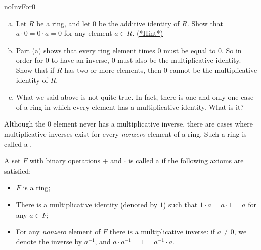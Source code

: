 \begin{exercise}{noInvFor0}
\begin{enumerate}[(a)]
\item
Let $R$ be a ring, and let $0$ be the additive identity of $R$.  Show that $a \cdot 0 = 0 \cdot a = 0$ for any element $a \in R$. 
\hyperref[sec:polyrings:hints]{(*Hint*)} 
\item
Part (a) shows that every ring element times 0 must be equal to 0.  So in order for 0 to have an inverse, 0 must also be the multiplicative identity. Show that 
if $R$ has two or more elements, then 0 cannot be the multiplicative identity of $R$.
\item
What we said above is not quite true. In fact, there is one and only one case of a ring in which every element has a multiplicative identity. What is it? 
\end{enumerate}
\end{exercise} 

%


Although the 0 element never has a multiplicative inverse, there are cases where multiplicative inverses exist for every \emph{nonzero} element of a ring. Such a ring is called a . 

\begin{defn} \label{def:divisionring}
A set  $F$ with binary operations + and $\cdot$ is called a  if the following axioms are satisfied:
\begin{itemize}
\item
$F$ is a ring;
\item
There is a multiplicative identity (denoted by $1$) such that $1 \cdot a = a \cdot 1 = a$ for any $a \in F$;
\item
For any \emph{nonzero} element of $F$ there is a multiplicative inverse:  if $a \neq 0$, we denote the inverse by $a^{-1}$, and  $a\cdot a^{-1}=1=a^{-1}\cdot a$.
\end{itemize}
\end{defn}


